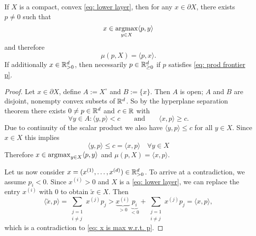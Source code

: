 \begin{lemma}
	\label{lem: duality of support function}
	If \(X\) is a compact, convex \ref{eq: lower
	layer}, then for any \(x\in \partial X\), there exists
	\(p\neq 0\) such that
	\begin{equation}
		\label{eq: prod frontier p}
		x \in \argmax_{y\in X} \langle p, y\rangle %
	\end{equation}
	and therefore
	\[
		\mu(p, X) = \langle p, x\rangle.
	\]
	If additionally \(x\in\mathbb{R}_{>0}^d\), then necessarily \(p\in\mathbb{R}_{\ge
	0}^d\) if \(p\) satisfies \eqref{eq: prod frontier p}.
\end{lemma}
\begin{proof}
	Let \(x\in \partial X\), define \(A:=X^\circ\) and \(B:=\{x\}\). Then \(A\)
	is open; \(A\) and \(B\) are disjoint, nonempty
	convex subsets of \(\mathbb{R}^d\). So by the hyperplane separation theorem
	there exists
	\(0\neq p\in\mathbb{R}^d\) and \(c\in\mathbb{R}\) with
	\[
		\forall y\in A : \langle y, p\rangle < c
		\qquad\text{and}\qquad
		\langle x, p\rangle \ge c.
	\]
	Due to continuity of the scalar product we also have \(\langle y, p\rangle
	\le c\) for all \(y\in X\). Since \(x\in X\) this implies
	\begin{equation}
		\label{eq: x is max w.r.t. p}
		\langle y, p\rangle \le c = \langle x, p\rangle \quad \forall y\in X
	\end{equation}
	Therefore \(x\in\operatorname*{argmax}_{y\in X} \langle p, y\rangle\) and \(\mu(p, X) =
	\langle x, p\rangle\).

	Let us now consider \(x=(x^{(1)},\dots,x^{(d)})\in\mathbb{R}_{>0}^d\).
	To arrive at a contradiction, we assume \(p_i < 0\). Since \(x^{(i)}>0\) and
	\(X\) is a \ref{eq: lower layer}, we can replace the entry \(x^{(i)}\) with
	\(0\) to obtain \(\tilde{x}\in X\). Then
	\[
		\langle \tilde{x}, p\rangle
		= \sum_{\substack{j=1\\i\neq j}} x^{(j)} p_j
		> \underbrace{x^{(i)}}_{>0}\underbrace{p_i}_{<0}
		+ \sum_{\substack{j=1\\i\neq j}} x^{(j)} p_j
		= \langle x, p\rangle,
	\]
	which is a contradiction to \eqref{eq: x is max w.r.t. p}.
\end{proof}

